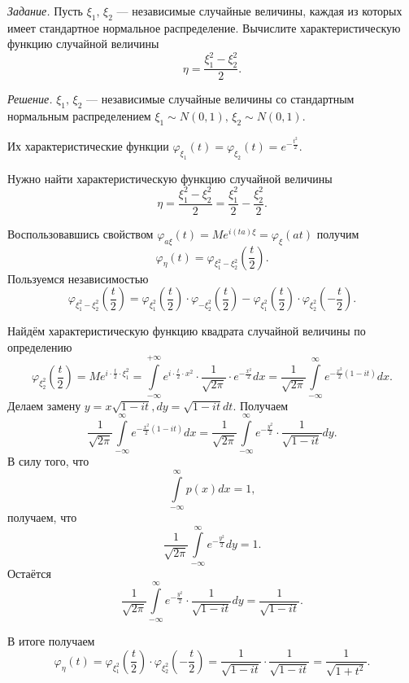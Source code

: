 \textit{Задание.} Пусть $ \xi_1, \, \xi_2$ --- независимые случайные величины, каждая из которых имеет стандартное нормальное распределение.
Вычислите характеристическую функцию случайной величины
$$ \eta =
\frac{ \xi_1^2 - \xi_2^2}{2}.$$

\textit{Решение.}
$ \xi_1, \, \xi_2$ --- независимые случайные величины со стандартным нормальным распределением $ \xi_1 \sim N \left( 0, 1 \right), \, \xi_2 \sim N \left( 0, 1 \right) $.

Их характеристические функции $ \varphi_{ \xi_1} \left( t \right) = \varphi_{ \xi_2} \left( t \right) = e^{- \frac{t^2}{2}}$.

Нужно найти характеристическую функцию случайной величины
$$ \eta =
\frac{ \xi_1^2 - \xi_2^2}{2} =
\frac{ \xi_1^2}{2} - \frac{ \xi_2^2}{2}.$$

Воспользовавшись свойством $ \varphi_{a \xi } \left( t \right) = Me^{i \left( ta \right) \xi } = \varphi_{ \xi } \left( at \right) $ получим
$$ \varphi_{ \eta } \left( t \right) = \varphi_{ \xi_1^2 - \xi_2^2} \left( \frac{t}{2} \right).$$
Пользуемся независимостью
$$ \varphi_{ \xi_1^2 - \xi_2^2} \left( \frac{t}{2} \right) =
\varphi_{ \xi_1^2} \left( \frac{t}{2} \right) \cdot \varphi_{- \xi_2^2} \left( \frac{t}{2} \right) -
\varphi_{ \xi_1^2} \left( \frac{t}{2} \right) \cdot \varphi_{ \xi_2^2} \left( - \frac{t}{2} \right).$$

Найдём характеристическую функцию квадрата случайной величины по определению
$$ \varphi_{ \xi_2^2} \left( \frac{t}{2} \right) =
Me^{i \cdot \frac{t}{2} \cdot \xi_1^2} =
\int \limits_{- \infty }^{+ \infty } e^{i \cdot \frac{t}{2} \cdot x^2} \cdot \frac{1}{ \sqrt{2 \pi }} \cdot e^{- \frac{x^2}{2}}dx =
\frac{1}{ \sqrt{2 \pi }} \int \limits_{- \infty }^{ \infty } e^{- \frac{x^2}{2} \left( 1 - it \right) }dx.$$
Делаем замену $y = x \sqrt{1 - it}, dy = \sqrt{1 - it}dt$.
Получаем
$$ \frac{1}{ \sqrt{2 \pi }} \int \limits_{- \infty }^{ \infty } e^{- \frac{x^2}{2} \left( 1 - it \right) }dx =
\frac{1}{ \sqrt{2 \pi }} \int \limits_{- \infty }^{ \infty } e^{- \frac{y^2}{2}} \cdot \frac{1}{ \sqrt{1 - it}} dy.$$
В силу того, что
$$ \int \limits_{- \infty }^{ \infty }p \left( x \right) dx = 1,$$
получаем, что
$$ \frac{1}{ \sqrt{2 \pi }} \int \limits_{- \infty }^{ \infty } e^{- \frac{y^2}{2}}dy = 1.$$
Остаётся
$$ \frac{1}{ \sqrt{2 \pi }} \int \limits_{- \infty }^{ \infty } e^{- \frac{y^2}{2}} \cdot \frac{1}{ \sqrt{1 - it}} dy =
\frac{1}{ \sqrt{1 - it}}.$$

В итоге получаем
$$ \varphi_{ \eta } \left( t \right) =
\varphi_{ \xi_1^2} \left( \frac{t}{2} \right) \cdot \varphi_{ \xi_2^2} \left( - \frac{t}{2} \right) =
\frac{1}{ \sqrt{1 - it}} \cdot \frac{1}{ \sqrt{1 - it}} =
\frac{1}{ \sqrt{1 + t^2}}.$$

